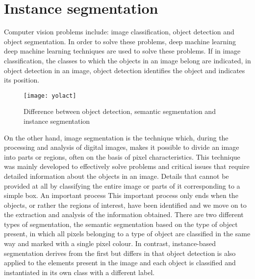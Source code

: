 \section{Instance segmentation}%
Computer vision problems include: image classification, object detection and object segmentation. In order to solve these problems, deep machine learning deep machine
learning techniques are used to solve these problems. If in image classification, the classes to which the objects in an image belong are indicated, in object detection
in an image, object detection identifies the object and indicates its position.

\begin{figure}[h]
    \centering
    \texttt{[image: yolact]}
    \caption{Difference between object detection, semantic segmentation and instance segmentation}
\end{figure}

On the other hand, image segmentation is the technique which, during the processing and
analysis of digital images, makes it possible to divide an image into parts or regions, often on the basis of pixel characteristics. This technique was mainly developed
to effectively solve problems and critical issues that require detailed information about the objects in an image. Details that cannot be provided at all by classifying
the entire image or parts of it corresponding to a simple box. An important process This important process only ends when the objects, or rather the regions of interest,
have been identified and we move on to the extraction and analysis of the information obtained.
There are two different types of segmentation, the semantic segmentation based on the type of object present, in which all pixels belonging to a type of object are
classified in the same way and marked with a single pixel colour. In contrast, instance-based segmentation derives from the first but differs in that object detection
is also applied to the elements present in the image and each object is classified and instantiated in its own class with a different label.


